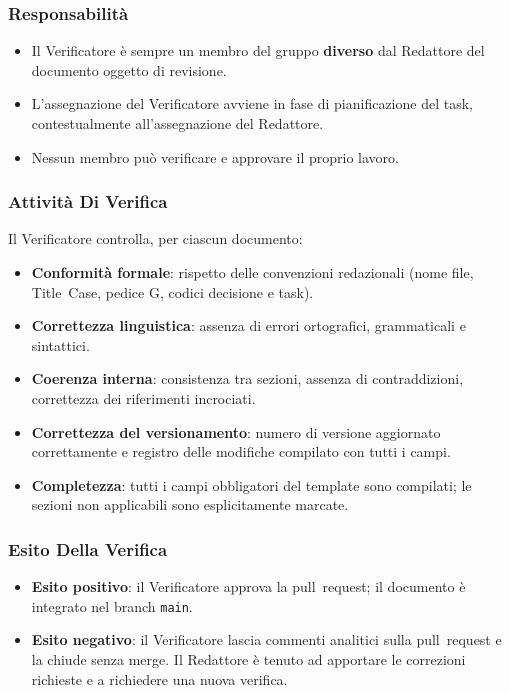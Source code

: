 \subsubsection{Responsabilità}
 
\begin{itemize}
  \item Il Verificatore è sempre un membro del gruppo \textbf{diverso} dal Redattore
        del documento oggetto di revisione.
  \item L'assegnazione del Verificatore avviene in fase di pianificazione del task,
        contestualmente all'assegnazione del Redattore.
  \item Nessun membro può verificare e approvare il proprio lavoro.
\end{itemize}
 
\subsubsection{Attività Di Verifica}
 
Il Verificatore controlla, per ciascun documento:
 
\begin{itemize}
  \item \textbf{Conformità formale}: rispetto delle convenzioni redazionali
        (nome file, Title~Case, pedice G, codici decisione e task).
  \item \textbf{Correttezza linguistica}: assenza di errori ortografici,
        grammaticali e sintattici.
  \item \textbf{Coerenza interna}: consistenza tra sezioni, assenza di
        contraddizioni, correttezza dei riferimenti incrociati.
  \item \textbf{Correttezza del versionamento}: numero di versione aggiornato
        correttamente e registro delle modifiche compilato con tutti i campi.
  \item \textbf{Completezza}: tutti i campi obbligatori del template sono compilati;
        le sezioni non applicabili sono esplicitamente marcate.
\end{itemize}
 
\subsubsection{Esito Della Verifica}
 
\begin{itemize}
  \item \textbf{Esito positivo}: il Verificatore approva la
        pull~request; il documento è integrato nel branch
        \texttt{main}.
  \item \textbf{Esito negativo}: il Verificatore lascia commenti analitici sulla
        pull~request e la chiude senza merge. Il Redattore è tenuto
        ad apportare le correzioni richieste e a richiedere una nuova verifica.
\end{itemize}
